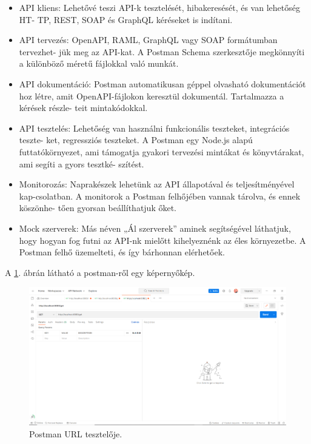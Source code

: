 \begin{itemize}
\item API kliens: Lehetővé teszi API-k tesztelését, hibakeresését, és van lehetőség 
HT-
TP, REST, SOAP és GraphQL kéréseket is indítani.
\item API tervezés: OpenAPI, RAML, GraphQL vagy SOAP formátumban tervezhet-
jük meg az API-kat. A Postman Schema szerkesztője megkönnyíti a különböző méretű fájlokkal való munkát.
\item API dokumentáció: Postman automatikusan géppel olvasható dokumentációt hoz létre, amit OpenAPI-fájlokon keresztül dokumentál. Tartalmazza a kérések részle-
teit mintakódokkal.
\item API tesztelés: Lehetőség van használni funkcionális teszteket, integrációs teszte-
ket, regressziós teszteket. A Postman egy Node.js alapú futtatókörnyezet, ami támogatja gyakori tervezési mintákat és  könyvtárakat, ami segíti a gyors tesztké-
szítést.
\item Monitorozás: Naprakészek lehetünk az API állapotával és teljesítményével kap-csolatban. A monitorok a Postman felhőjében vannak tárolva, és ennek köszönhe-
tően gyorsan beállíthatjuk őket.
\item Mock szerverek: Más néven „Ál szerverek” aminek segítségével láthatjuk, hogy hogyan fog futni az API-nk mielőtt kihelyeznénk az éles környezetbe. A Postman felhő üzemelteti, és így bárhonnan elérhetőek.
\end{itemize}

A \ref{fig:Postman}. ábrán látható a postman-ről egy képernyőkép.

\begin{figure}[h]
\centering
\includegraphics[scale=0.8]{images/Postman.png}
\caption{Postman URL tesztelője.}
\label{fig:Postman}
\end{figure}
\newpage

